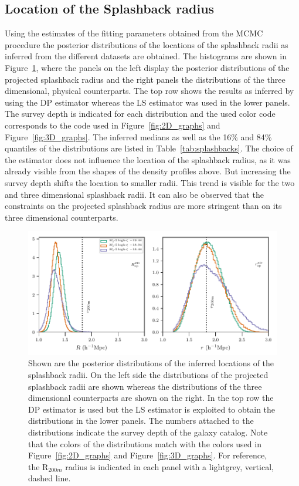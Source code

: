 \documentclass[a4paper,fleqn,usenatbib]{mnras}
\begin{document}
\subsection{Location of the Splashback radius}
Using the estimates of the fitting parameters obtained from the MCMC procedure the posterior distributions of the locations of the splashback radii as inferred from the different datasets are obtained. The histograms are shown in Figure~\ref{fig:splashback}, where the panels on the left display the posterior distributions of the projected splashback radius and the right panels the distributions of the three dimensional, physical counterparts. The top row shows the results as inferred by using the DP estimator whereas the LS estimator was used in the lower panels. The survey depth is indicated for each distribution and the used color code corresponds to the code used in Figure~\ref{fig:2D_graphs} and Figure~\ref{fig:3D_graphs}. The inferred medians as well as the 16\% and 84\% quantiles of the distributions are listed in Table~\ref{tab:splashbacks}. 
The choice of the estimator does not influence the location of the splashback radius, as it was already visible from the shapes of the density profiles above. But increasing the survey depth shifts the location to smaller radii. This trend is visible for the two and three dimensional splashback radii. It can also be observed that the constraints on the projected splashback radius are more stringent than on its three dimensional counterparts.


\begin{figure}
    \includegraphics[width= \textwidth]{splashback.pdf}
\caption{Shown are the posterior distributions of the inferred locations of the splashback radii. On the left side the distributions of the projected splashback radii are shown whereas the distributions of the three dimensional counterparts are shown on the right. In the top row the DP estimator is used but the LS estimator is exploited to obtain the distributions in the lower panels. The numbers attached to the distributions indicate the survey depth of the galaxy catalog. Note that the colors of the distributions match with the colors used in Figure~\ref{fig:2D_graphs} and Figure~\ref{fig:3D_graphs}. For reference, the R$_{200m}$ radius is indicated in each panel with a lightgrey, vertical, dashed line.}
   \label{fig:splashback} 
\end{figure}
\end{document}
